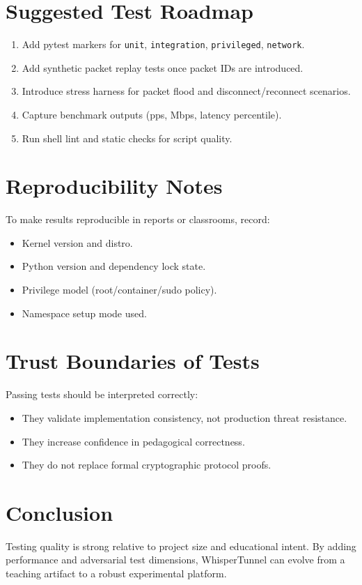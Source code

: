\section{Suggested Test Roadmap}
\begin{enumerate}[leftmargin=2em]
\item Add pytest markers for \texttt{unit}, \texttt{integration}, \texttt{privileged}, \texttt{network}.
\item Add synthetic packet replay tests once packet IDs are introduced.
\item Introduce stress harness for packet flood and disconnect/reconnect scenarios.
\item Capture benchmark outputs (pps, Mbps, latency percentile).
\item Run shell lint and static checks for script quality.
\end{enumerate}

\section{Reproducibility Notes}
To make results reproducible in reports or classrooms, record:
\begin{itemize}[leftmargin=2em]
\item Kernel version and distro.
\item Python version and dependency lock state.
\item Privilege model (root/container/sudo policy).
\item Namespace setup mode used.
\end{itemize}

\section{Trust Boundaries of Tests}
Passing tests should be interpreted correctly:
\begin{itemize}[leftmargin=2em]
\item They validate implementation consistency, not production threat resistance.
\item They increase confidence in pedagogical correctness.
\item They do not replace formal cryptographic protocol proofs.
\end{itemize}

\section{Conclusion}
Testing quality is strong relative to project size and educational intent. By adding performance and adversarial test dimensions, WhisperTunnel can evolve from a teaching artifact to a robust experimental platform.
